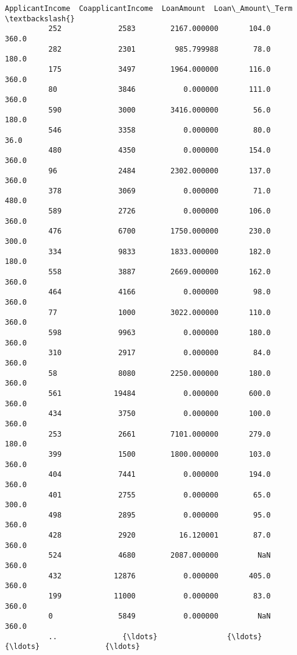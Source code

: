 \documentclass[11pt]{article}
\begin{document}
\begin{Verbatim}[commandchars=\\\{\}]
               ApplicantIncome  CoapplicantIncome  LoanAmount  Loan\_Amount\_Term  \textbackslash{}
          252             2583        2167.000000       104.0             360.0   
          282             2301         985.799988        78.0             180.0   
          175             3497        1964.000000       116.0             360.0   
          80              3846           0.000000       111.0             360.0   
          590             3000        3416.000000        56.0             180.0   
          546             3358           0.000000        80.0              36.0   
          480             4350           0.000000       154.0             360.0   
          96              2484        2302.000000       137.0             360.0   
          378             3069           0.000000        71.0             480.0   
          589             2726           0.000000       106.0             360.0   
          476             6700        1750.000000       230.0             300.0   
          334             9833        1833.000000       182.0             180.0   
          558             3887        2669.000000       162.0             360.0   
          464             4166           0.000000        98.0             360.0   
          77              1000        3022.000000       110.0             360.0   
          598             9963           0.000000       180.0             360.0   
          310             2917           0.000000        84.0             360.0   
          58              8080        2250.000000       180.0             360.0   
          561            19484           0.000000       600.0             360.0   
          434             3750           0.000000       100.0             360.0   
          253             2661        7101.000000       279.0             180.0   
          399             1500        1800.000000       103.0             360.0   
          404             7441           0.000000       194.0             360.0   
          401             2755           0.000000        65.0             300.0   
          498             2895           0.000000        95.0             360.0   
          428             2920          16.120001        87.0             360.0   
          524             4680        2087.000000         NaN             360.0   
          432            12876           0.000000       405.0             360.0   
          199            11000           0.000000        83.0             360.0   
          0               5849           0.000000         NaN             360.0   
          ..               {\ldots}                {\ldots}         {\ldots}               {\ldots}   

\end{Verbatim}
\end{document}
